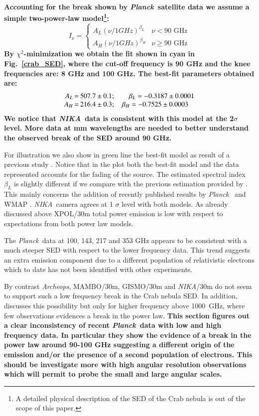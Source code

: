 \documentclass[twocolumn,traditabstract]{aa}
\def\NIKA{\textit{NIKA}}
\def\Planck{\textit{Planck}}
\begin{document}
\textbf{Accounting for the break shown by \Planck\ satellite data we assume a simple
two-power-law model\footnote{A detailed physical description of the SED of the
  Crab nebula is out of the scope of this paper.}:
\begin{equation}
I_{\nu} = \left\{ 
\begin{array}{rl}A_L(\nu/1GHz)^{\beta_L} &\mbox{$\nu<90$ GHz} \\
   A_H(\nu/1GHz)^{\beta_H} &\mbox{$\nu\geq90$ GHz}
  \end{array} \right.    
\end{equation}
By $\chi^2$-minimization we obtain the fit shown in cyan in Fig.~\ref{crab_SED},
where the cut-off frequency is 90 GHz and the knee frequencies are: 8 GHz and 100 GHz. 
The best-fit parameters obtained are:
$$\setlength\arraycolsep{0.1em}
 \begin{array}{rclcl}
  A_L&=& 507.7\pm0.1 ; \quad \quad   \beta_L = -0.3187\pm0.0001\\
  A_H&=& 216.4\pm0.3 ; \quad \beta_H = -0.7525\pm0.0003
 \end{array}
$$
We notice that \NIKA\ data is consistent with this model at the 2$\sigma$ level. More data at mm wavelengths are needed to better understand the observed break of the SED around 90 GHz. }

For illustration we also show in green line the best-fit model as result of a previous study \citet{macias2010}. 
Notice that in the plot both the best-fit model and the data represented accounts for the fading of the source.
The estimated spectral index $\beta_L$ is slightly different if we compare with the previous estimation provided by \cite{macias2010}. This mainly concerns the addition of recently published results by \Planck\ \citep{2015arXiv150702058P} and  WMAP \citep{2011ApJS..192...19W}.
\NIKA\ camera agrees at 1 $\sigma$ level with both models. 
As already discussed above XPOL/30m total power emission is low with respect to expectations from both power law models.
 
The \Planck\ data at 100, 143, 217 and 353 GHz appears to be consistent with a much steeper SED with respect to the lower frequency data. This trend suggests  an extra emission component due to a different
population of relativistic electrons \citep{1965ARA&A...3..297G, 2012ApJ...760...96G} which to date has not been identified with other experiments. 

By contrast {\it Archeops}, MAMBO/30m, GISMO/30m
and \NIKA/30m do not seem to support such a low frequency break in the Crab nebula SED. In addition, \cite{macias2010} discusses this possibility but only for higher frequency above 1000~GHz, where few observations evidences a break in the power law. 
\textbf{This section figures out a clear inconsistency of recent \Planck\ data with low and high frequency data. In particular they show the evidence of a break in the power law around 90-100 GHz suggesting a different origin of the emission and/or the presence of a second population of electrons. This should be investigate more with high angular resolution observations which will permit to probe the small and large angular scales.}
\end{document}
